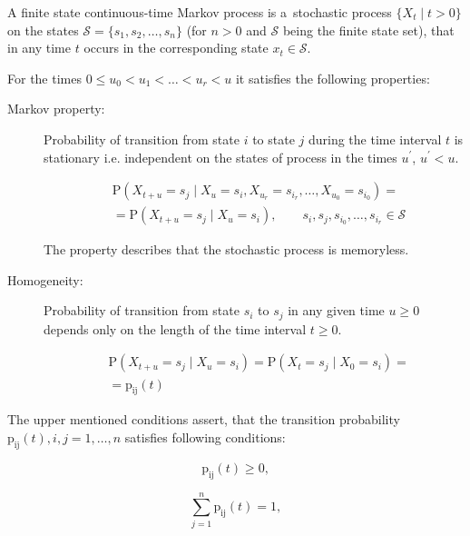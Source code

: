 \documentclass[thesis=M,english]{FITthesis}[2012/10/20]
\begin{document}
A finite state continuous-time Markov process is a~stochastic process $\{ X_t \mid t > 0\}$ on the states $\mathcal{S} = \{ s_1, s_2, \dots, s_n \}$  (for $n>0$ and $\mathcal{S}$ being the finite state set), that in any time $t$  occurs in the corresponding state $x_t \in \mathcal{S}$. 

For the times $0 \leq u_0 < u_1 < \dots < u_r < u$ it satisfies the following properties: 
\begin{description}
\item [Markov property:] Probability of transition from state $i$ to state $j$ during the time interval $t$ is stationary i.e. independent on the states of process in the times $u^{'}$, $ u^{'} < u$.  
    
\begin{equation}
\begin{aligned}
& \mathrm{P}( X_{t+u} = s_j \mid X_u = s_i, X_{u_r} = s_{i_r}, \dots , X_{u_0} = s_{i_0} ) = \\ 
& = \mathrm{P}( X_{t+u} = s_j \mid X_u = s_i ), \qquad s_i,s_j,s_{i_0}, \dots ,s_{i_r} \in \mathcal{S} 
\end{aligned}
\end{equation}

The property describes that the stochastic process is memoryless.

\item [Homogeneity:] Probability of transition from state $s_i$ to $s_j$ in any given time $u \geq 0$ depends only on the length of the time interval $t \geq 0$. 

\begin{equation}
\begin{aligned}
& \mathrm{P}( X_{t+u} = s_j \mid X_u = s_i ) = \mathrm{P}( X_t = s_j \mid X_0 = s_i ) = \\
& = \mathrm{p_{ij}}(t)
\end{aligned}
\end{equation}

\end{description}
 

The upper mentioned conditions assert, that the transition probability $\mathrm{p_{ij}}(t), i,j = 1,\dots,n$ satisfies following conditions: \cite{Ka75}


\begin{equation}
\mathrm{p_{ij}}(t) \geq 0,
\end{equation}

\begin{equation}
\sum_{j = 1}^n \mathrm{p_{ij}}(t) = 1,
\end{equation}
\end{document}
